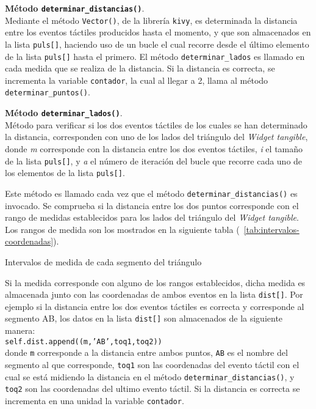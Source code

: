 \textbf{Método \texttt{determinar\_distancias()}}.\\
Mediante el método \texttt{Vector()}, de la librería \texttt{kivy}, es determinada la distancia entre los eventos táctiles producidos hasta el momento, y que son almacenados en la lista \texttt{puls[]}, haciendo uso de un bucle el cual recorre desde el último elemento de la lista \texttt{puls[]} hasta el primero. El método \texttt{determinar\_lados} es llamado en cada medida que se realiza de la distancia. Si la distancia es correcta, se incrementa la variable \texttt{contador}, la cual al llegar a 2, llama al método \texttt{determinar\_puntos()}.

\textbf{Método \texttt{determinar\_lados()}}.\\
Método para verificar si los dos eventos táctiles de los cuales se han determinado la distancia, corresponden con uno de los lados del triángulo del \textit{Widget tangible}, donde \textit{m} corresponde con la distancia entre los dos eventos táctiles, \textit{i} el tamaño de la lista \texttt{puls[]}, y \textit{a} el número de iteración del bucle que recorre cada uno de los elementos de la lista \texttt{puls[]}.

Este método es llamado cada vez que el método \texttt{determinar\_distancias()} es invocado.
Se comprueba si la distancia entre los dos puntos corresponde con el rango de medidas establecidos para los lados del triángulo del \emph{Widget tangible}. Los rangos de medida son los mostrados en la siguiente tabla (~\ref{tab:intervalos-coordenadas}).

\begin{table}[hp]
\centering
{\small

}
\caption[Intervalos de medida de cada segmento del triángulo]
{Intervalos de medida de cada segmento del triángulo}
\label{tab:intervalos-coordenadas}
\end{table}
Si la medida corresponde con alguno de los rangos establecidos, dicha medida es almacenada junto con las coordenadas de ambos eventos en la lista \texttt{dist[]}. Por ejemplo si la distancia entre los dos eventos táctiles es correcta y corresponde al segmento AB, los datos en la lista \texttt{dist[]} son almacenados de la siguiente manera:\\
\texttt{self.dist.append((m,'AB',toq1,toq2)) }\\
donde \texttt{m} corresponde a la distancia entre ambos puntos, \texttt{AB} es el nombre del segmento al que corresponde, \texttt{toq1} son las coordenadas del evento táctil con el cual se está midiendo la distancia en el método \texttt{determinar\_distancias()}, y \texttt{toq2} son las coordenadas del ultimo evento táctil.
Si la distancia es correcta se incrementa en una unidad la variable \texttt{contador}.

